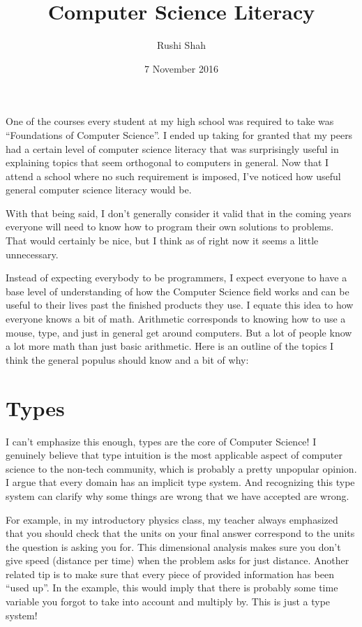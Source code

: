 \documentclass[12pt]{article}
\title{Computer Science Literacy}
\author{Rushi Shah}
\date{7 November 2016}
\begin{document}
  \maketitle

    One of the courses every student at my high school was required to take was ``Foundations of Computer Science''. I ended up taking for granted that my peers had a certain level of computer science literacy that was surprisingly useful in explaining topics that seem orthogonal to computers in general. Now that I attend a school where no such requirement is imposed, I've noticed how useful general computer science literacy would be. 

    With that being said, I don't generally consider it valid that in the coming years everyone will need to know how to program their own solutions to problems. That would certainly be nice, but I think as of right now it seems a little unnecessary. 

    Instead of expecting everybody to be programmers, I expect everyone to have a base level of understanding of how the Computer Science field works and can be useful to their lives past the finished products they use. I equate this idea to how everyone knows a bit of math. Arithmetic corresponds to knowing how to use a mouse, type, and just in general get around computers. But a lot of people know a lot more math than just basic arithmetic. Here is an outline of the topics I think the general populus should know and a bit of why:

    \section{Types}

      I can't emphasize this enough, types are the core of Computer Science! I genuinely believe that type intuition is the most applicable aspect of computer science to the non-tech community, which is probably a pretty unpopular opinion. I argue that every domain has an implicit type system. And recognizing this type system can clarify why some things are wrong that we have accepted are wrong. 

      For example, in my introductory physics class, my teacher always emphasized that you should check that the units on your final answer correspond to the units the question is asking you for. This dimensional analysis makes sure you don't give speed (distance per time) when the problem asks for just distance. Another related tip is to make sure that every piece of provided information has been ``used up''. In the example, this would imply that there is probably some time variable you forgot to take into account and multiply by. This is just a type system!
\end{document}
